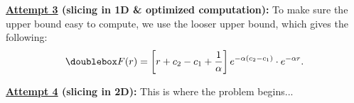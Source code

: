 \documentclass[12pt]{article}
\begin{document}
\textbf{\underline{Attempt 3} (slicing in 1D \& optimized computation):}
To make sure the upper bound easy to compute, we use the looser upper bound, which gives the following:
\begin{align*}
    \mdoublebox{F(r) = \brac{r + c_2 - c_1 + \frac{1}{\alpha}}e^{-\alpha(c_2 - c_1)} \cdot e^{-\alpha r}.}
\end{align*}

\textbf{\underline{Attempt 4} (slicing in 2D):} This is where the problem begins...
\end{document}

